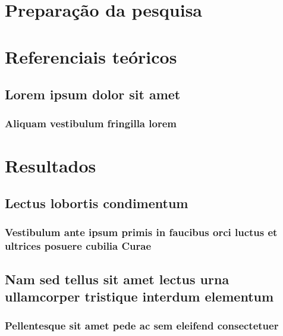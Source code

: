 \part{Preparação da pesquisa}



\part{Referenciais teóricos}

\chapter{Lorem ipsum dolor sit amet}

\section{Aliquam vestibulum fringilla lorem}

\lipsum[1]

\lipsum[2-3]

\part{Resultados}

\chapter{Lectus lobortis condimentum}

\section{Vestibulum ante ipsum primis in faucibus orci luctus et ultrices
  posuere cubilia Curae}

\lipsum[21-22]

\chapter{Nam sed tellus sit amet lectus urna ullamcorper tristique interdum
  elementum}

\section{Pellentesque sit amet pede ac sem eleifend consectetuer}

\lipsum[24]
